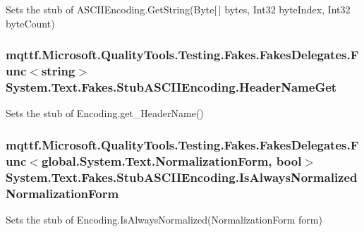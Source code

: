 Sets the stub of A\-S\-C\-I\-I\-Encoding.\-Get\-String(\-Byte\mbox{[}$\,$\mbox{]} bytes, Int32 byte\-Index, Int32 byte\-Count)

\hypertarget{class_system_1_1_text_1_1_fakes_1_1_stub_a_s_c_i_i_encoding_a50d646a3672a54ccae010c2f4309842f}{
\subsubsection[{Header\-Name\-Get}]{\setlength{\rightskip}{0pt plus 5cm}mqttf.\-Microsoft.\-Quality\-Tools.\-Testing.\-Fakes.\-Fakes\-Delegates.\-Func$<$string$>$ System.\-Text.\-Fakes.\-Stub\-A\-S\-C\-I\-I\-Encoding.\-Header\-Name\-Get}}\label{class_system_1_1_text_1_1_fakes_1_1_stub_a_s_c_i_i_encoding_a50d646a3672a54ccae010c2f4309842f}


Sets the stub of Encoding.\-get\-\_\-\-Header\-Name()

\hypertarget{class_system_1_1_text_1_1_fakes_1_1_stub_a_s_c_i_i_encoding_a03348a0dd66f0557eda665b9b89cafa3}{
\subsubsection[{Is\-Always\-Normalized\-Normalization\-Form}]{\setlength{\rightskip}{0pt plus 5cm}mqttf.\-Microsoft.\-Quality\-Tools.\-Testing.\-Fakes.\-Fakes\-Delegates.\-Func$<$global.\-System.\-Text.\-Normalization\-Form, bool$>$ System.\-Text.\-Fakes.\-Stub\-A\-S\-C\-I\-I\-Encoding.\-Is\-Always\-Normalized\-Normalization\-Form}}\label{class_system_1_1_text_1_1_fakes_1_1_stub_a_s_c_i_i_encoding_a03348a0dd66f0557eda665b9b89cafa3}


Sets the stub of Encoding.\-Is\-Always\-Normalized(\-Normalization\-Form form)

